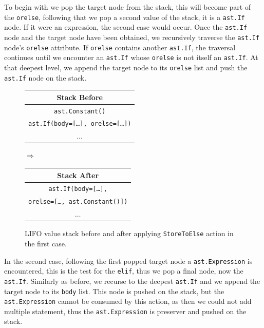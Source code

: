 To begin with we pop the target node from the stack, this will become part of the \texttt{orelse}, following that we pop a second value of the stack, it is a \texttt{ast.If} node. If it were an expression, the second case would occur. Once the \texttt{ast.If} node and the target node have been obtained, we recursively traverse the \texttt{ast.If} node's \texttt{orelse} attribute. If \texttt{orelse} contains another \texttt{ast.If}, the traversal continues until we encounter an \texttt{ast.If} whose \texttt{orelse} is not itself an \texttt{ast.If}. At that deepest level, we append the target node to its \texttt{orelse} list and push the \texttt{ast.If} node on the stack.
\begin{figure}[H]\label{fig:storeToElse-stack-1}
  \centering
  {\small
  \begin{tabular}{|c|}
    \hline
    \textbf{Stack Before} \\ \hline
    \texttt{\tiny{ast.}}\texttt{Constant()}\\ \hline
    \texttt{\tiny{ast.}}\texttt{If(body=[\dots], orelse=[\dots])}\\ \hline
    \(\dots\)             \\ \hline
  \end{tabular}
  \hspace{0.25em}$\Longrightarrow$\hspace{0.25em}
  \begin{tabular}{|c|}
    \hline
    \textbf{Stack After} \\ \hline
    \texttt{\tiny{ast.}}\texttt{If(body=[\dots],}\\
    \texttt{orelse=[\dots, }\texttt{\tiny{ast.}}\texttt{Constant()])}\\ \hline
    \(\dots\)                       \\ \hline
  \end{tabular}
  }
  \caption{LIFO value stack before and after applying \texttt{StoreToElse} action in the first case.}
  
\end{figure}

In the second case, following the first popped target node a \texttt{ast.Expression} is encountered, this is the test for the \texttt{elif}, thus we pop a final node, now the \texttt{ast.If}. Similarly as before, we recurse to the deepest \texttt{ast.If} and we append the target node to its \texttt{body} list. This node is pushed on the stack, but the \texttt{ast.Expression} cannot be consumed by this action, as then we could not add multiple statement, thus the \texttt{ast.Expression} is preserver and pushed on the stack.

